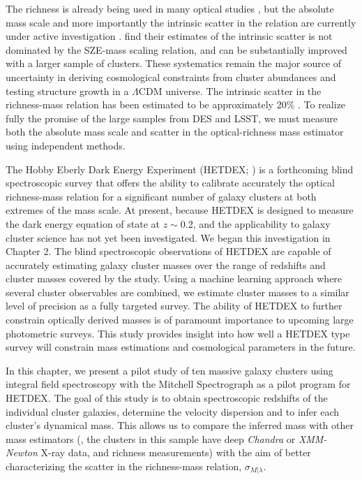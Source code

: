 The richness is already being used in many optical studies , but the absolute mass scale and more importantly the intrinsic scatter in the relation are currently under active investigation . \cite{Saro2015} find their estimates of the intrinsic scatter is not dominated by the SZE-mass scaling relation, and can be substantially improved with a larger sample of clusters. These systematics remain the major source of uncertainty in deriving cosmological constraints from cluster abundances and testing structure growth in a $\Lambda$CDM universe. The intrinsic scatter in the richness-mass relation has been estimated to be approximately 20\% \citep{Saro2015, Rykoff2016}. To realize fully the promise of the large samples from DES and LSST, we must measure both the absolute mass scale and scatter in the optical-richness mass estimator using independent methods.

The Hobby Eberly Dark Energy Experiment (HETDEX; \citealt{Hill2008}) is a forthcoming blind spectroscopic survey that offers the ability to calibrate accurately the optical richness-mass relation for a significant number of galaxy clusters at both extremes of the mass scale. At present, because HETDEX is designed to measure the dark energy equation of state at $z\sim0.2$, and the applicability to galaxy cluster science has not yet been investigated.  We began this investigation in Chapter 2. The blind spectroscopic observations of HETDEX are capable of accurately estimating galaxy cluster masses over the range of redshifts and cluster masses covered by the study. Using a machine learning approach where several cluster observables are combined, we estimate cluster masses to a similar level of precision as a fully targeted survey. The ability of HETDEX to further constrain optically derived masses is of paramount importance to upcoming large photometric surveys. This study provides insight into how well a HETDEX type survey will constrain mass estimations and cosmological parameters in the future.

In this chapter, we present a pilot study of ten massive galaxy clusters using integral field spectroscopy with the Mitchell Spectrograph as a pilot program for HETDEX. The goal of this study is to obtain spectroscopic redshifts of the individual cluster galaxies, determine the velocity dispersion and to infer each cluster's dynamical mass. This allows us to compare the inferred mass with other mass estimators (\eg, the clusters in this sample have deep \textit{Chandra} or \textit{XMM-Newton} X-ray data, and richness measurements) with the aim of better characterizing the scatter in the richness-mass relation, $\sigma_{M|\lambda}$.

